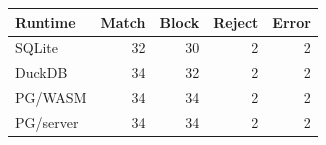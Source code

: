 \begin{tabular}{lrrrr}
\toprule
Runtime & Match & Block & Reject & Error \\
\midrule
SQLite & 32 & 30 & 2 & 2 \\
DuckDB & 34 & 32 & 2 & 2 \\
PG/WASM & 34 & 34 & 2 & 2 \\
PG/server & 34 & 34 & 2 & 2 \\
\bottomrule
\end{tabular}
